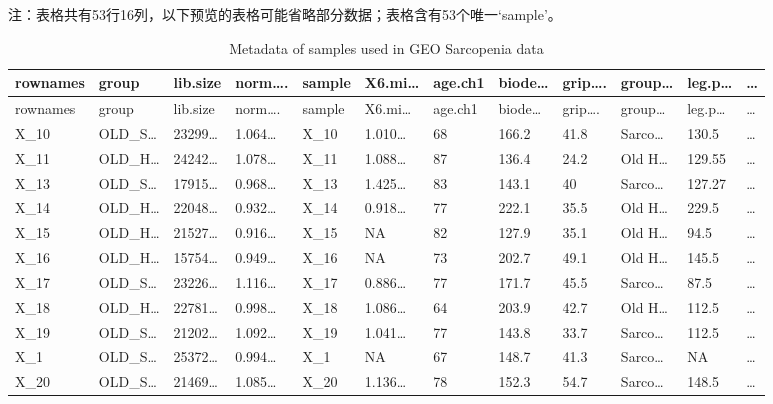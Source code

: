 \documentclass[
]{article}
\begin{document}
\begin{center}\begin{tcolorbox}[colback=gray!10, colframe=gray!50, width=0.9\linewidth, arc=1mm, boxrule=0.5pt]注：表格共有53行16列，以下预览的表格可能省略部分数据；表格含有53个唯一`sample'。
\end{tcolorbox}
\end{center}

\begin{longtable}[]{@{}llllllllllll@{}}
\caption{\label{tab:metadata-of-samples-used-in-GEO-Sarcopenia-data}Metadata of samples used in GEO Sarcopenia data}\tabularnewline
\toprule
rownames & group & lib.size & norm\ldots. & sample & X6.mi\ldots{} & age.ch1 & biode\ldots{} & grip\ldots. & group\ldots{} & leg.p\ldots{} & \ldots{}\tabularnewline
\midrule
\endfirsthead
\toprule
rownames & group & lib.size & norm\ldots. & sample & X6.mi\ldots{} & age.ch1 & biode\ldots{} & grip\ldots. & group\ldots{} & leg.p\ldots{} & \ldots{}\tabularnewline
\midrule
\endhead
X\_10 & OLD\_S\ldots{} & 23299\ldots{} & 1.064\ldots{} & X\_10 & 1.010\ldots{} & 68 & 166.2 & 41.8 & Sarco\ldots{} & 130.5 & \ldots{}\tabularnewline
X\_11 & OLD\_H\ldots{} & 24242\ldots{} & 1.078\ldots{} & X\_11 & 1.088\ldots{} & 87 & 136.4 & 24.2 & Old H\ldots{} & 129.55 & \ldots{}\tabularnewline
X\_13 & OLD\_S\ldots{} & 17915\ldots{} & 0.968\ldots{} & X\_13 & 1.425\ldots{} & 83 & 143.1 & 40 & Sarco\ldots{} & 127.27 & \ldots{}\tabularnewline
X\_14 & OLD\_H\ldots{} & 22048\ldots{} & 0.932\ldots{} & X\_14 & 0.918\ldots{} & 77 & 222.1 & 35.5 & Old H\ldots{} & 229.5 & \ldots{}\tabularnewline
X\_15 & OLD\_H\ldots{} & 21527\ldots{} & 0.916\ldots{} & X\_15 & NA & 82 & 127.9 & 35.1 & Old H\ldots{} & 94.5 & \ldots{}\tabularnewline
X\_16 & OLD\_H\ldots{} & 15754\ldots{} & 0.949\ldots{} & X\_16 & NA & 73 & 202.7 & 49.1 & Old H\ldots{} & 145.5 & \ldots{}\tabularnewline
X\_17 & OLD\_S\ldots{} & 23226\ldots{} & 1.116\ldots{} & X\_17 & 0.886\ldots{} & 77 & 171.7 & 45.5 & Sarco\ldots{} & 87.5 & \ldots{}\tabularnewline
X\_18 & OLD\_H\ldots{} & 22781\ldots{} & 0.998\ldots{} & X\_18 & 1.086\ldots{} & 64 & 203.9 & 42.7 & Old H\ldots{} & 112.5 & \ldots{}\tabularnewline
X\_19 & OLD\_S\ldots{} & 21202\ldots{} & 1.092\ldots{} & X\_19 & 1.041\ldots{} & 77 & 143.8 & 33.7 & Sarco\ldots{} & 112.5 & \ldots{}\tabularnewline
X\_1 & OLD\_S\ldots{} & 25372\ldots{} & 0.994\ldots{} & X\_1 & NA & 67 & 148.7 & 41.3 & Sarco\ldots{} & NA & \ldots{}\tabularnewline
X\_20 & OLD\_S\ldots{} & 21469\ldots{} & 1.085\ldots{} & X\_20 & 1.136\ldots{} & 78 & 152.3 & 54.7 & Sarco\ldots{} & 148.5 & \ldots{}\tabularnewline

\end{longtable}
\end{document}
